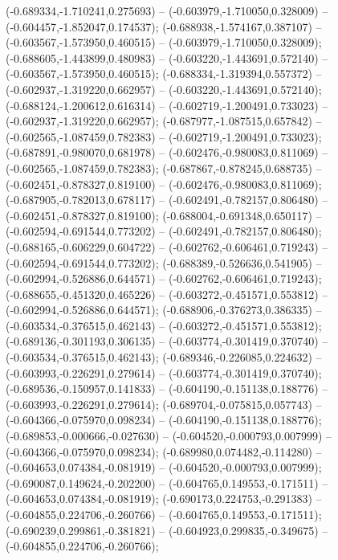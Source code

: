  (-0.689334,-1.710241,0.275693) -- (-0.603979,-1.710050,0.328009) -- (-0.604457,-1.852047,0.174537);
 (-0.688938,-1.574167,0.387107) -- (-0.603567,-1.573950,0.460515) -- (-0.603979,-1.710050,0.328009);
 (-0.688605,-1.443899,0.480983) -- (-0.603220,-1.443691,0.572140) -- (-0.603567,-1.573950,0.460515);
 (-0.688334,-1.319394,0.557372) -- (-0.602937,-1.319220,0.662957) -- (-0.603220,-1.443691,0.572140);
 (-0.688124,-1.200612,0.616314) -- (-0.602719,-1.200491,0.733023) -- (-0.602937,-1.319220,0.662957);
 (-0.687977,-1.087515,0.657842) -- (-0.602565,-1.087459,0.782383) -- (-0.602719,-1.200491,0.733023);
 (-0.687891,-0.980070,0.681978) -- (-0.602476,-0.980083,0.811069) -- (-0.602565,-1.087459,0.782383);
 (-0.687867,-0.878245,0.688735) -- (-0.602451,-0.878327,0.819100) -- (-0.602476,-0.980083,0.811069);
 (-0.687905,-0.782013,0.678117) -- (-0.602491,-0.782157,0.806480) -- (-0.602451,-0.878327,0.819100);
 (-0.688004,-0.691348,0.650117) -- (-0.602594,-0.691544,0.773202) -- (-0.602491,-0.782157,0.806480);
 (-0.688165,-0.606229,0.604722) -- (-0.602762,-0.606461,0.719243) -- (-0.602594,-0.691544,0.773202);
 (-0.688389,-0.526636,0.541905) -- (-0.602994,-0.526886,0.644571) -- (-0.602762,-0.606461,0.719243);
 (-0.688655,-0.451320,0.465226) -- (-0.603272,-0.451571,0.553812) -- (-0.602994,-0.526886,0.644571);
 (-0.688906,-0.376273,0.386335) -- (-0.603534,-0.376515,0.462143) -- (-0.603272,-0.451571,0.553812);
 (-0.689136,-0.301193,0.306135) -- (-0.603774,-0.301419,0.370740) -- (-0.603534,-0.376515,0.462143);
 (-0.689346,-0.226085,0.224632) -- (-0.603993,-0.226291,0.279614) -- (-0.603774,-0.301419,0.370740);
 (-0.689536,-0.150957,0.141833) -- (-0.604190,-0.151138,0.188776) -- (-0.603993,-0.226291,0.279614);
 (-0.689704,-0.075815,0.057743) -- (-0.604366,-0.075970,0.098234) -- (-0.604190,-0.151138,0.188776);
 (-0.689853,-0.000666,-0.027630) -- (-0.604520,-0.000793,0.007999) -- (-0.604366,-0.075970,0.098234);
 (-0.689980,0.074482,-0.114280) -- (-0.604653,0.074384,-0.081919) -- (-0.604520,-0.000793,0.007999);
 (-0.690087,0.149624,-0.202200) -- (-0.604765,0.149553,-0.171511) -- (-0.604653,0.074384,-0.081919);
 (-0.690173,0.224753,-0.291383) -- (-0.604855,0.224706,-0.260766) -- (-0.604765,0.149553,-0.171511);
 (-0.690239,0.299861,-0.381821) -- (-0.604923,0.299835,-0.349675) -- (-0.604855,0.224706,-0.260766);
